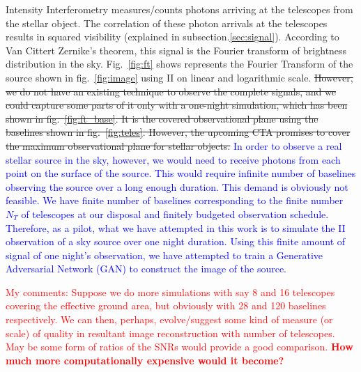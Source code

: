 Intensity Interferometry measures/counts photons arriving at the telescopes from the stellar object. The correlation of these photon arrivals at the telescopes results in squared visibility (explained in subsection.\ref{sec:signal}). According to Van Cittert Zernike's theorem, this signal is the Fourier transform of brightness distribution in the sky. Fig.~\ref {fig:ft} shows represents the Fourier Transform of the source shown in fig.~\ref{fig:image} using II on linear and logarithmic scale. 
\sout
{However, we do not have an existing technique to observe the complete signals, and we could capture some parts of it only with a one-night simulation, which has been shown in fig.~\ref{fig:ft_base}. It is the covered observational plane using the baselines shown in fig.~\ref{fig:teles}. However, the upcoming CTA promises to cover the maximum observational plane for stellar objects.}
\textcolor{blue}{In order to observe a real stellar source in the sky, however, we would need to receive photons from each point on the surface of the source. This would require infinite number of baselines observing the source over a long enough duration. This demand is obviously not feasible. We have finite number of baselines corresponding to the finite number $N_T$ of telescopes at our disposal and finitely budgeted observation schedule. Therefore, as a pilot, what we have attempted in this work is to simulate the II observation of a sky source over one night duration. Using this finite amount of signal of one night's observation, we have attempted to train a Generative Adversarial Network (GAN) to construct the image of the source.}  

\textcolor{red}{My comments: Suppose we do more simulations with say 8 and 16 telescopes covering the effective ground area, but obviously with 28 and 120 baselines respectively. We can then, perhaps, evolve/suggest some kind of measure (or scale) of quality in resultant image reconstruction with number of telescopes. May be some form of ratios of the SNRs would provide a good comparison. {\bf How much more computationally expensive would it become?}}